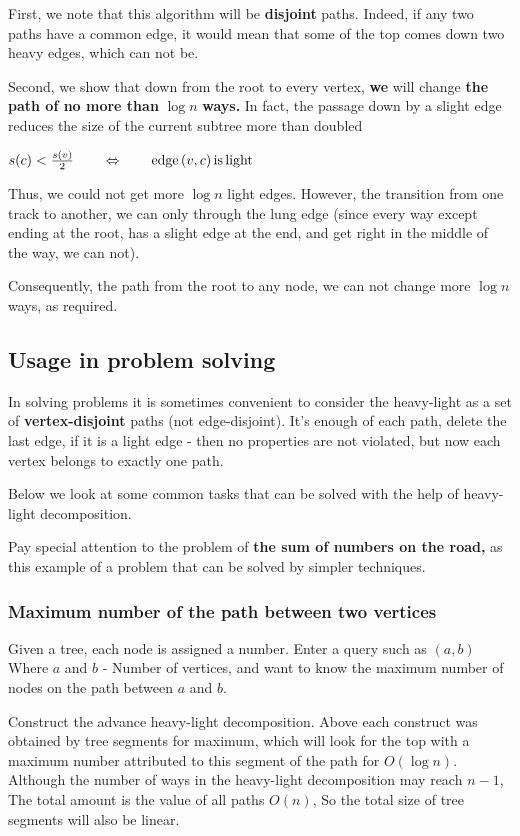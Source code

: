 First, we note that this algorithm will be \textbf{disjoint} paths. Indeed, if any two paths have a common edge, it would mean that some of the top comes down two heavy edges, which can not be.

Second, we show that down from the root to every vertex, \textbf{we} will change \textbf{the path of no more than} \textbf{$\log n$} \textbf{ways.} In fact, the passage down by a slight edge reduces the size of the current subtree more than doubled

$s(c)<\frac{s(v)}{2}\qquad\Leftrightarrow\qquad{\rm edge\,}(v,c){\rm \, is\, light}$

Thus, we could not get more $\log n$ light edges. However, the transition from one track to another, we can only through the lung edge (since every way except ending at the root, has a slight edge at the end, and get right in the middle of the way, we can not).

Consequently, the path from the root to any node, we can not change more $\log n$ ways, as required.

\subsection{ Usage in problem solving }

In solving problems it is sometimes convenient to consider the heavy-light as a set of \textbf{vertex-disjoint} paths (not edge-disjoint). It's enough of each path, delete the last edge, if it is a light edge - then no properties are not violated, but now each vertex belongs to exactly one path.

Below we look at some common tasks that can be solved with the help of heavy-light decomposition.

Pay special attention to the problem of \textbf{the sum of numbers on the road,} as this example of a problem that can be solved by simpler techniques.

\subsubsection{ Maximum number of the path between two vertices }

Given a tree, each node is assigned a number. Enter a query such as $(a, b)$ Where $a$ and $b$ - Number of vertices, and want to know the maximum number of nodes on the path between $a$ and $b$.

Construct the advance heavy-light decomposition. Above each construct was obtained by tree segments for maximum, which will look for the top with a maximum number attributed to this segment of the path for $O (\log n)$. Although the number of ways in the heavy-light decomposition may reach $n-1$, The total amount is the value of all paths $O (n)$, So the total size of tree segments will also be linear.


